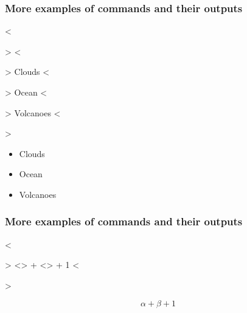 
\begin{frame}[fragile]
\frametitle{More examples of commands and their outputs}
\begin{framed}
\begin{minipage}[b]{.4\textwidth}
  \begin{verbnobox}[\vbdelim]
<\begin{>itemize<}>
<\item> Clouds 
<\item> Ocean 
<\item> Volcanoes 
<\end{>itemize<}>  
\end{verbnobox}
\end{minipage}%
\end{framed}
\begin{framed}
\begin{minipage}[b]{.4\textwidth}
\begin{itemize}
\item Clouds \\
\item Ocean \\
\item Volcanoes \\
\end{itemize}
\end{minipage}
\end{framed}
\end{frame}


\begin{frame}[fragile]
\frametitle{More examples of commands and their outputs}
\begin{framed}
\begin{minipage}[b]{.4\textwidth}
  \begin{verbnobox}[\vbdelim]
<\begin{>equation<}>
<\alpha> + <\beta> + 1  
<\end{>equation<}>  
\end{verbnobox}
\end{minipage}%
\end{framed}
\begin{framed}
\begin{minipage}[b]{.4\textwidth}
\begin{equation}
\alpha + \beta + 1
\end{equation}
\end{minipage}
\end{framed}
\end{frame}


